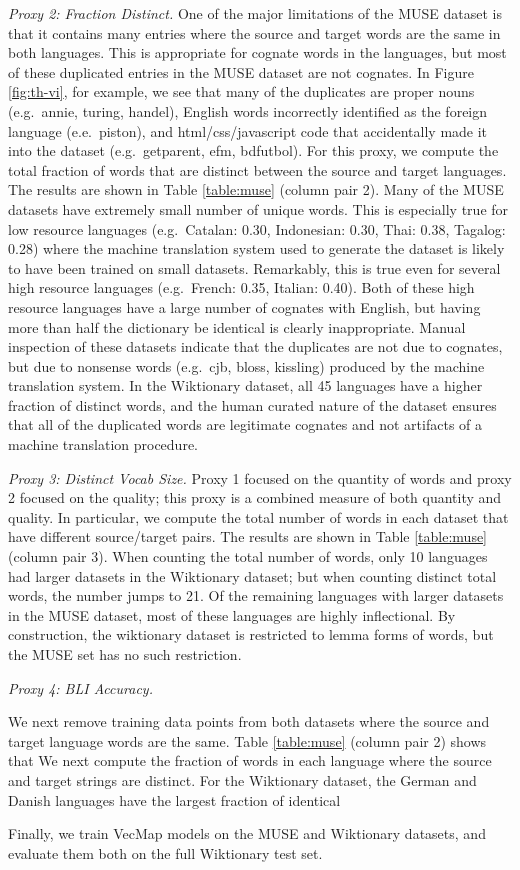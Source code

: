 \documentclass[11pt]{article}
\begin{document}
{\textit{Proxy 2: Fraction Distinct.}
One of the major limitations of the MUSE dataset is that it contains many entries where the source and target words are the same in both languages.
This is appropriate for cognate words in the languages, but most of these duplicated entries in the MUSE dataset are not cognates.
In Figure \ref{fig:th-vi}, for example, we see that many of the duplicates are proper nouns (e.g.\ annie, turing, handel), English words incorrectly identified as the foreign language (e.e.\ piston), and html/css/javascript code that accidentally made it into the dataset (e.g.\ getparent, efm, bdfutbol).
For this proxy, we compute the total fraction of words that are distinct between the source and target languages.
The results are shown in Table \ref{table:muse} (column pair 2).
Many of the MUSE datasets have extremely small number of unique words.
This is especially true for low resource languages (e.g.\ Catalan: 0.30, Indonesian: 0.30, Thai: 0.38, Tagalog: 0.28) where the machine translation system used to generate the dataset is likely to have been trained on small datasets.
Remarkably, this is true even for several high resource languages (e.g.\ French: 0.35, Italian: 0.40).
Both of these high resource languages have a large number of cognates with English,
but having more than half the dictionary be identical is clearly inappropriate.
Manual inspection of these datasets indicate that the duplicates are not due to cognates, but due to nonsense words (e.g.\ cjb, bloss, kissling) produced by the machine translation system.
In the Wiktionary dataset, all 45 languages have a higher fraction of distinct words,
and the human curated nature of the dataset ensures that all of the duplicated words are legitimate cognates and not artifacts of a machine translation procedure.

\textit{Proxy 3: Distinct Vocab Size.}
Proxy 1 focused on the quantity of words and proxy 2 focused on the quality;
this proxy is a combined measure of both quantity and quality.
In particular, we compute the total number of words in each dataset that have different source/target pairs.
The results are shown in Table \ref{table:muse} (column pair 3).
When counting the total number of words, only 10 languages had larger datasets in the Wiktionary dataset;
but when counting distinct total words, the number jumps to 21.
Of the remaining languages with larger datasets in the MUSE dataset,
most of these languages are highly inflectional.
By construction, the wiktionary dataset is restricted to lemma forms of words,
but the MUSE set has no such restriction.

\textit{Proxy 4: BLI Accuracy.}

We next remove training data points from both datasets where the source and target language words are the same.
Table \ref{table:muse} (column pair 2) shows that
We next compute the fraction of words in each language where the source and target strings are distinct.
For the Wiktionary dataset, the German and Danish languages have the largest fraction of identical 

Finally, we train VecMap models on the MUSE and Wiktionary datasets, and evaluate them both on the full Wiktionary test set.
}
\end{document}
